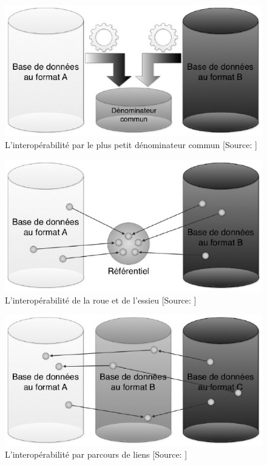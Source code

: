 \begin{figure}[!h]
\centering
\includegraphics[width=12cm]{images/interop_denom_commun.jpeg}
\medskip
\caption[L'interopérabilité par le plus petit dénominateur commun]{L'interopérabilité par le plus petit dénominateur commun [Source: \cite{bermes_convergence_2013}]}
\label{denom}
\end{figure}

\begin{figure}[!h]
\centering
\includegraphics[width=12cm]{images/interop_hub_spoke.jpeg}
\medskip
\caption[L'interopérabilité de le roue et de l'essieu]{L'interopérabilité de la roue et de l'essieu [Source: \cite{bermes_convergence_2013}]}
\label{hub_spoke}
\end{figure}

\begin{figure}[!h]
\centering
\includegraphics[width=12cm]{images/interop_follow_nose.jpeg}
\medskip
\caption[L'interopérabilité par parcours de liens]{L'interopérabilité par parcours de liens [Source: \cite{bermes_convergence_2013}]}
\label{interop_follow_nose}
\end{figure}

